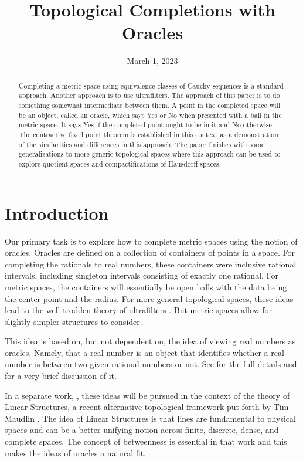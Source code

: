 \documentclass[12pt]{article}
\title{Topological Completions with Oracles}
\date{March 1, 2023}
\begin{document}
\maketitle
\begin{abstract}
Completing a metric space using equivalence classes of Cauchy sequences is a standard approach. Another approach is to use ultrafilters. The approach of this paper is to do something somewhat intermediate between them. A point in the completed space will be an object, called an oracle, which says Yes or No when presented with a ball in the metric space. It says Yes if the completed point ought to be in it and No otherwise. The contractive fixed point theorem is established in this context as a demonstration of the similarities and differences in this approach. The paper finishes with some generalizations to more generic topological spaces where this approach can be used to explore quotient spaces and compactifications of Hausdorff spaces. 
\end{abstract}

\tableofcontents

\section{Introduction}

Our primary task is to explore how to complete metric spaces using the notion of oracles. Oracles are defined on a collection of containers of points in a space. For completing the rationals to real numbers, these containers were inclusive rational intervals, including singleton intervals consisting of exactly one rational. For metric spaces, the containers will essentially be open balls with the data being the center point and the radius. For more general topological spaces, these ideas lead to the well-trodden theory of ultrafilters \cite{samuel}. But metric spaces allow for slightly simpler structures to consider. 

This idea is based on, but not dependent on, the idea of viewing real numbers as oracles. Namely, that a real number is an object that identifies whether a real number is between two given rational numbers or not. See \cite{taylor23main} for the full details and \cite{taylor23teaser} for a very brief discussion of it. 
 
In a separate work, \cite{taylor23maudlin}, these ideas will be pursued in the context of the theory of Linear Structures, a recent alternative topological framework put forth by Tim Maudlin \cite{maudlin}. The idea of Linear Structures is that lines are fundamental to physical spaces and can be a better unifying notion across finite, discrete, dense, and complete spaces. The concept of betweenness is essential in that work and this makes the ideas of oracles a natural fit. 
\end{document}
